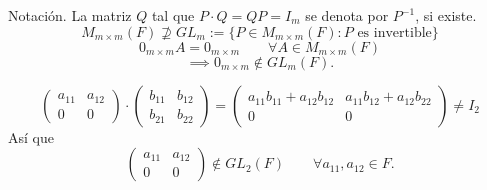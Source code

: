 \documentclass[12pt,a4paper]{book}
\begin{document}
    Notación. La matriz $Q$ tal que $P\cdot Q=QP=I_{m}$ se denota por $P^{-1}$, si existe.
    \begin{equation*}
        M_{m\times m}(F)\not\supseteq GL_{m}:=\{P\in M_{m\times m}(F):P\text{ es invertible}\}
    \end{equation*}
    \begin{equation*}
        0_{m\times m}A=0_{m\times m}\qquad\forall A\in M_{m\times m}(F)
    \end{equation*}
    \begin{equation*}
        \implies0_{m\times m}\notin GL_{m}(F).
    \end{equation*}

    \begin{ejemplo}
        \begin{equation*}
            \begin{pmatrix}
                a_{11} & a_{12}\\
                0 & 0
            \end{pmatrix}
            \cdot
            \begin{pmatrix}
                b_{11} & b_{12}\\
                b_{21} & b_{22}
            \end{pmatrix}
            =
            \begin{pmatrix}
                a_{11}b_{11}+a_{12}b_{12} & a_{11}b_{12}+a_{12}b_{22}\\
                0 & 0
            \end{pmatrix}
            \neq I_{2}
        \end{equation*}
        Así que
        \begin{equation*}
            \begin{pmatrix}
                a_{11} & a_{12}\\
                0 & 0
            \end{pmatrix}
            \notin GL_{2}(F)\qquad\forall a_{11},a_{12}\in F.
        \end{equation*}
    \end{ejemplo}
\end{document}
